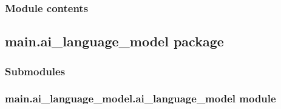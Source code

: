 \documentclass[letterpaper,10pt,english]{sphinxmanual}
\begin{document}
\subsubsection{Module contents}
\label{\detokenize{main.ai_doxygen_cleaner:module-main.ai_doxygen_cleaner}}\label{\detokenize{main.ai_doxygen_cleaner:module-contents}}
\sphinxstepscope


\subsection{main.ai\_language\_model package}
\label{\detokenize{main.ai_language_model:main-ai-language-model-package}}\label{\detokenize{main.ai_language_model::doc}}

\subsubsection{Submodules}
\label{\detokenize{main.ai_language_model:submodules}}

\subsubsection{main.ai\_language\_model.ai\_language\_model module}
\label{\detokenize{main.ai_language_model:module-main.ai_language_model.ai_language_model}}\label{\detokenize{main.ai_language_model:main-ai-language-model-ai-language-model-module}}
\end{document}
